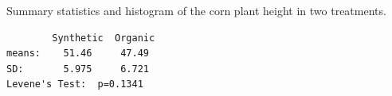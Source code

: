 \documentclass[10pt,openany]{book}\usepackage[]{graphicx}\usepackage[]{color}
\begin{document}
\begin{table}[htbp]
  \caption{Summary statistics and histogram of the corn plant height in two treatments.}
  \label{tab:CornFert}
  \begin{center}
    \begin{minipage}{3in}
      \begin{Verbatim}
        Synthetic  Organic
means:    51.46     47.49
SD:       5.975     6.721
Levene's Test:  p=0.1341
      \end{Verbatim}
    \end{minipage}
    \begin{minipage}{2in}
    \end{minipage}
  \end{center}
\end{table}
\end{document}
